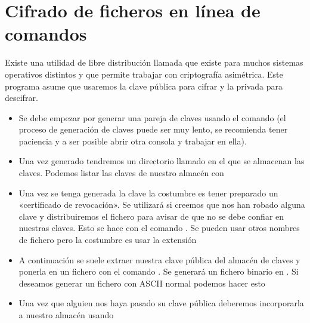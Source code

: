 \documentclass[letterpaper,10pt,spanish]{sphinxmanual}
\begin{document}
\section{Cifrado de ficheros en línea de comandos}
\label{\detokenize{tema_pautas_seguridad_informatica/tema_pautas_seguridad_informatica:cifrado-de-ficheros-en-linea-de-comandos}}
Existe una utilidad de libre distribución llamada  que existe para muchos sistemas operativos distintos y que permite trabajar con criptografía asimétrica. Este programa asume que usaremos la clave pública para cifrar y la privada para descifrar.
\begin{itemize}
\item {} 
Se debe empezar por generar una pareja de claves usando el comando  (el proceso de generación de claves puede ser muy lento, se recomienda tener paciencia y a ser posible abrir otra consola y trabajar en ella).

\item {} 
Una vez generado tendremos un directorio llamado  en el que se almacenan las claves. Podemos listar las claves de nuestro almacén con 

\item {} 
Una vez se tenga generada la clave la costumbre es tener preparado un «certificado de revocación». Se utilizará si creemos que nos han robado alguna clave y distribuiremos el fichero para avisar de que no se debe confiar en nuestras claves. Esto se hace con el comando  . Se pueden usar otros nombres de fichero pero la costumbre es usar la extensión 

\item {} 
A continuación se suele extraer nuestra clave pública del almacén de claves y ponerla en un fichero con el comando  . Se generará un fichero binario en  . Si deseamos generar un fichero con ASCII normal podemos hacer esto 

\item {} 
Una vez que alguien nos haya pasado su clave pública deberemos incorporarla a nuestro almacén usando 


\end{itemize}
\end{document}

